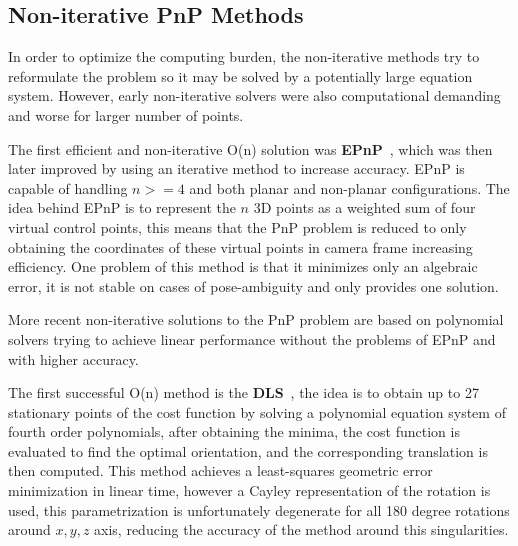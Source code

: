 \documentclass[letterpaper, 10 pt, conference]{ieeeconf}  %
\begin{document}

\subsection{Non-iterative PnP Methods}

In order to optimize the computing burden, the non-iterative methods try to reformulate the problem so it may be solved by a potentially large equation system. However, early non-iterative solvers were also computational demanding and worse for larger number of points.

The first efficient and non-iterative O(n) solution was \textbf{EPnP}~\cite{Lepetit2008}, which was then later improved by using an iterative method to increase accuracy. EPnP is capable of handling $n >= 4$ and both planar and non-planar configurations. The idea behind EPnP is to represent the $n$ 3D points as a weighted sum of four virtual control points, this means that the PnP problem is reduced to only obtaining the coordinates of these virtual points in camera frame increasing efficiency. One problem of this method is that it minimizes only an algebraic error, it is not stable on cases of pose-ambiguity and only provides one solution. %

More recent non-iterative solutions to the PnP problem are based on polynomial solvers trying to achieve linear performance without the problems of EPnP and with higher accuracy. 

The first successful O(n) method is the \textbf{DLS}~\cite{Hesch2011}, the idea is to obtain up to 27 stationary points of the cost function by solving a polynomial equation system of fourth order polynomials, after obtaining the minima, the cost function is evaluated to find the optimal orientation, and the corresponding translation is then computed. This method achieves a least-squares geometric error minimization in linear time, however a Cayley representation of the rotation is used, this parametrization is unfortunately degenerate for all 180 degree rotations around $x,y,z$ axis, reducing the accuracy of the method around this singularities. %
\end{document}
